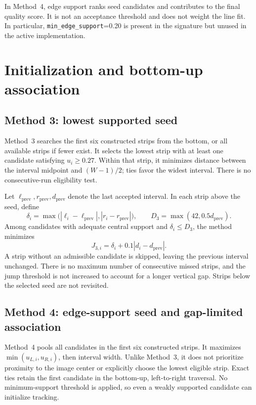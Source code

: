 In Method~4, edge support ranks seed candidates and contributes to the
final quality score. It is not an acceptance threshold and does not
weight the line fit. In particular, \texttt{min\_edge\_support}=0.20
is present in the signature but unused in the active implementation.

\section{Initialization and bottom-up association}
\label{sec:c4_selection}

\subsection{Method 3: lowest supported seed}
\label{subsec:c4_seed3}

Method~3 searches the first six constructed strips from the bottom, or
all available strips if fewer exist. It selects the lowest strip with at
least one candidate satisfying $u_i\geq0.27$. Within that strip, it
minimizes distance between the interval midpoint and $(W-1)/2$; ties
favor the widest interval. There is no consecutive-run eligibility test.

Let $\ell_{\mathrm{prev}},r_{\mathrm{prev}},d_{\mathrm{prev}}$ denote
the last accepted interval. In each strip above the seed, define
\begin{equation}
    \delta_i=\max\bigl(|\ell_i-\ell_{\mathrm{prev}}|,
                            |r_i-r_{\mathrm{prev}}|\bigr),\qquad
    D_3=\max(42,0.5d_{\mathrm{prev}}).
\end{equation}
Among candidates with adequate central support and $\delta_i\leq D_3$,
the method minimizes
\begin{equation}
    J_{3,i}=\delta_i+0.1|d_i-d_{\mathrm{prev}}|.
    \label{eq:c4_cost3}
\end{equation}
A strip without an admissible candidate is skipped, leaving the previous
interval unchanged. There is no maximum number of consecutive missed
strips, and the jump threshold is not increased to account for a longer
vertical gap. Strips below the selected seed are not revisited.

\subsection{Method 4: edge-support seed and gap-limited association}
\label{subsec:c4_seed4}

Method~4 pools all candidates in the first six constructed strips. It
maximizes $\min(u_{L,i},u_{R,i})$, then interval width. Unlike Method~3,
it does not prioritize proximity to the image center or explicitly choose
the lowest eligible strip. Exact ties retain the first candidate in the
bottom-up, left-to-right traversal. No minimum-support threshold is
applied, so even a weakly supported candidate can initialize tracking.


